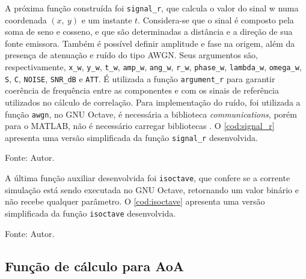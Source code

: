 A próxima função construída foi \lstinline|signal_r|, que calcula o valor do sinal \ac{w} numa coordenada $(x,~y)$ e um instante $t$.
Considera-se que o sinal é composto pela soma de seno e cosseno, e que são determinadas a distância e a direção de sua fonte emissora.
Também é possível definir amplitude e fase na origem, além da presença de atenuação e ruído do tipo \ac{AWGN}.
Seus argumentos são, respectivamente, \lstinline|x_w|, \lstinline|y_w|, \lstinline|t_w|, \lstinline|amp_w|, \lstinline|ang_w|, \lstinline|r_w|, \lstinline|phase_w|, \lstinline|lambda_w|, \lstinline|omega_w|, \lstinline|S|, \lstinline|C|, \lstinline|NOISE|, \lstinline|SNR_dB| e \lstinline|ATT|.
É utilizada a função \lstinline|argument_r| para garantir coerência de frequência entre as componentes e com os sinais de referência utilizados no cálculo de correlação.
Para implementação do ruído, foi utilizada a função \lstinline|awgn|, no GNU Octave, é necessária a biblioteca \textit{communications}, porém para o MATLAB, não é necessário carregar bibliotecas \cite{awgnOctave, awgnMATLAB}.
O \autoref{cod:signal_r} apresenta uma versão simplificada da função \lstinline|signal_r| desenvolvida.

\begin{lstfloat}[htbp]
	\centering
	
	\caption*{Fonte: Autor.}
\end{lstfloat}


A última função auxiliar desenvolvida foi \lstinline|isoctave|, que confere se a corrente simulação está sendo executada no GNU Octave, retornando um valor binário e não recebe qualquer parâmetro.
O \autoref{cod:isoctave} apresenta uma versão simplificada da função \lstinline|isoctave| desenvolvida.

\begin{lstfloat}[htbp]
	\centering
	
	\caption*{Fonte: Autor.}
\end{lstfloat}

\subsection{Função de cálculo para \acs{AoA}}

